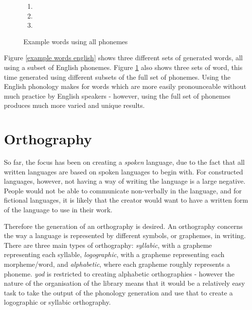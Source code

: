 \documentclass{report}
\begin{document}
	\begin{figure}
		\caption{Example words using all phonemes}
		\label{example words all}
		\begin{tcolorbox}
			\begin{enumerate}
				\item {}
				\item {}
				\item {}
			\end{enumerate}
		\end{tcolorbox}
	\end{figure}

	Figure \ref{example words english} shows three different sets of generated words, all using a subset of English phonemes. Figure \ref{example words all} also shows three sets of word, this time generated using different subsets of the full set of phonemes. Using the English phonology makes for words which are more easily pronounceable without much practice by English speakers - however, using the full set of phonemes produces much more varied and unique results.
	
	\chapter{Orthography}
	
	So far, the focus has been on creating a \textit{spoken} language, due to the fact that all written languages are based on spoken languages to begin with. For constructed languages, however, not having a way of writing the language is a large negative. People would not be able to communicate non-verbally in the language, and for fictional languages, it is likely that the creator would want to have a written form of the language to use in their work.
	
	Therefore the generation of an orthography is desired. An orthography concerns the way a language is represented by different symbols, or graphemes, in writing. There are three main types of orthography: \textit{syllabic}, with a grapheme representing each syllable, \textit{logographic}, with a grapheme representing each morpheme/word, and \textit{alphabetic}, where each grapheme roughly represents a phoneme. \textit{yod} is restricted to creating alphabetic orthographies - however the nature of the organisation of the library means that it would be a relatively easy task to take the output of the phonology generation and use that to create a logographic or syllabic orthography.
	
\end{document}
